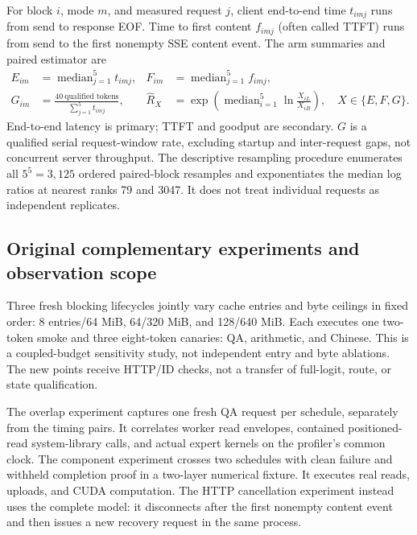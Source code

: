 For block $i$, mode $m$, and measured request $j$, client end-to-end time
$t_{imj}$ runs from send to response EOF. Time to first content $f_{imj}$
(often called TTFT) runs from send to the first nonempty SSE content event.
The arm summaries and paired estimator are
\begin{equation}
\begin{aligned}
 E_{im}&=\operatorname{median}_{j=1}^{5}t_{imj},&
 F_{im}&=\operatorname{median}_{j=1}^{5}f_{imj},\\
 G_{im}&=\frac{40\ \text{qualified tokens}}{\sum_{j=1}^{5}t_{imj}},&
 \widehat R_X&=\exp\!\left(\operatorname{median}_{i=1}^{5}
       \ln\frac{X_{iL}}{X_{iB}}\right),\quad X\in\{E,F,G\}.
\end{aligned}
\label{eq:paired-estimator}
\end{equation}
End-to-end latency is primary; TTFT and goodput are secondary. $G$ is a
qualified serial request-window rate, excluding startup and inter-request
gaps, not concurrent server throughput. The descriptive resampling procedure
enumerates all $5^5=3{,}125$ ordered paired-block resamples and exponentiates
the median log ratios at nearest ranks 79 and 3047. It does not treat
individual requests as independent replicates.

\subsection{Original complementary experiments and observation scope}
Three fresh blocking lifecycles jointly vary cache entries and byte ceilings
in fixed order: 8 entries/64 MiB, 64/320 MiB, and 128/640 MiB. Each executes
one two-token smoke and three eight-token canaries: QA, arithmetic, and
Chinese. This is a coupled-budget sensitivity study, not independent entry
and byte ablations. The new points receive HTTP/ID checks, not a transfer of
full-logit, route, or state qualification.

The overlap experiment captures one fresh QA request per schedule, separately
from the timing pairs. It correlates worker read envelopes, contained
positioned-read system-library calls, and actual expert kernels on the
profiler's common clock. The component experiment crosses two schedules
with clean failure and withheld completion proof in a two-layer numerical
fixture. It executes real reads, uploads, and CUDA computation. The HTTP
cancellation experiment instead uses the complete model: it disconnects
after the first nonempty content event and then issues a new recovery request
in the same process.

